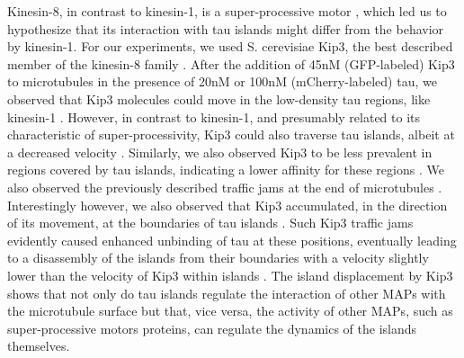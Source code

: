 Kinesin-8, in contrast to kinesin-1, is a super-processive motor , which led us to hypothesize that its interaction with tau islands might differ from the behavior by kinesin-1. For our experiments, we used S. cerevisiae Kip3, the best described member of the kinesin-8 family . After the addition of 45nM (GFP-labeled) Kip3 to microtubules in the presence of 20nM or 100nM (mCherry-labeled) tau, we observed that Kip3 molecules could move in the low-density tau regions, like kinesin-1 . However, in contrast to kinesin-1, and presumably related to its characteristic of super-processivity, Kip3 could also traverse tau islands, albeit at a decreased velocity . Similarly, we also observed Kip3 to be less prevalent in regions covered by tau islands, indicating a lower affinity for these regions . We also observed the previously described  traffic jams at the end of microtubules . Interestingly however, we also observed that Kip3 accumulated, in the direction of its movement, at the boundaries of tau islands . Such Kip3 traffic jams evidently caused enhanced unbinding of tau at these positions, eventually leading to a disassembly of the islands from their boundaries with a velocity slightly lower than the velocity of Kip3 within islands . The island displacement by Kip3 shows that not only do tau islands regulate the interaction of other MAPs with the microtubule surface but that, vice versa, the activity of other MAPs, such as super-processive motors proteins, can regulate the dynamics of the islands themselves.

